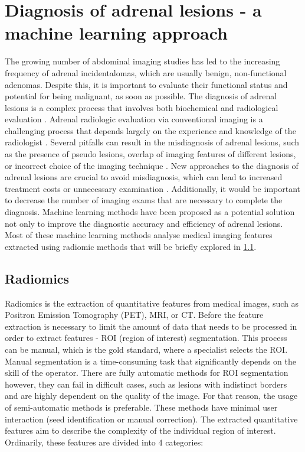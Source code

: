 \documentclass[11pt]{article}
\begin{document}
\section{Diagnosis of adrenal lesions - a machine learning approach}

The growing number of abdominal imaging studies has led to the increasing
frequency of adrenal incidentalomas, which are usually benign, non-functional
adenomas. Despite this, it is important to evaluate their functional status and
potential for being malignant, as soon as possible. The diagnosis of adrenal
lesions is a complex process that involves both biochemical and radiological
evaluation \cite{Anagnostis2009}. Adrenal radiologic evaluation via conventional
imaging is a challenging process that depends largely on the experience and
knowledge of the radiologist \cite{Zhang2022}. Several pitfalls can result in the
misdiagnosis of adrenal lesions, such as the presence of pseudo lesions, overlap
of imaging features of different lesions, or incorrect choice of the imaging
technique \cite{Elsayes2020}. New approaches to the diagnosis of adrenal lesions
are crucial to avoid misdiagnosis, which can lead to increased treatment costs
or unnecessary examination \cite{Zhang2022}. Additionally, it would be important
to decrease the number of imaging exams that are necessary to complete the
diagnosis. Machine learning methods have been proposed as a potential solution
not only to improve the diagnostic accuracy and efficiency of adrenal lesions. Most of these machine learning methods analyse medical
imaging features extracted using radiomic methods that will be briefly explored
in \ref{subsec:radiomic}.

\subsection{Radiomics}
\label{subsec:radiomic}

Radiomics is the extraction of quantitative features from medical images, such
as Positron Emission Tomography (PET), MRI, or CT. Before the feature extraction
is necessary to limit the amount of data that needs to be processed in order to
extract features - ROI (region of interest) segmentation. This process can be manual, which is the gold
standard, where a specialist selects the ROI. Manual segmentation is a
time-consuming task that significantly depends on the skill of the operator.
There are fully automatic methods for ROI segmentation however, they can fail in
difficult cases, such as lesions with indistinct borders and are highly
dependent on the quality of the image. For that reason, the usage of
semi-automatic methods is preferable. These methods have minimal user
interaction (seed identification or manual correction). The extracted
quantitative features aim to describe the complexity of the individual region of
interest. Ordinarily, these features are divided into 4 categories:
\end{document}
